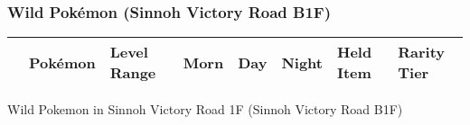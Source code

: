 \subsubsection{Wild Pokémon (Sinnoh Victory Road B1F)}%
\label{ssubsec:WildPokmon(SinnohVictoryRoadB1F)}%
\begin{longtable}{||l l l l l l l l||}%
\hline%
\rowcolor{gray}%
&Pokémon&Level Range&Morn&Day&Night&Held Item&Rarity Tier\\%
\hline%
\endhead%
\hline%
\end{longtable}%
\caption{Wild Pokemon in Sinnoh Victory Road 1F (Sinnoh Victory Road B1F)}
